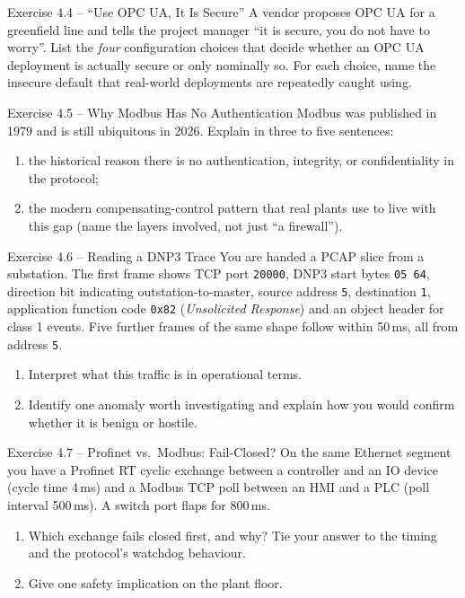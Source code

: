 \documentclass[11pt,a4paper]{article}
\begin{document}
\begin{taskbox}{Exercise 4.4 -- ``Use OPC UA, It Is Secure''}
A vendor proposes OPC UA for a greenfield line and tells the project manager
``it is secure, you do not have to worry''. List the \emph{four}
configuration choices that decide whether an OPC UA deployment is actually
secure or only nominally so. For each choice, name the insecure default that
real-world deployments are repeatedly caught using.
\end{taskbox}

\begin{taskbox}{Exercise 4.5 -- Why Modbus Has No Authentication}
Modbus was published in 1979 and is still ubiquitous in 2026. Explain in
three to five sentences:
\begin{enumerate}
  \item the historical reason there is no authentication, integrity, or
        confidentiality in the protocol;
  \item the modern compensating-control pattern that real plants use to live
        with this gap (name the layers involved, not just ``a firewall'').
\end{enumerate}
\end{taskbox}

\begin{taskbox}{Exercise 4.6 -- Reading a DNP3 Trace}
You are handed a PCAP slice from a substation. The first frame shows TCP
port \texttt{20000}, DNP3 start bytes \texttt{05 64}, direction bit
indicating outstation-to-master, source address \texttt{5}, destination
\texttt{1}, application function code \texttt{0x82} (\emph{Unsolicited
Response}) and an object header for class 1 events. Five further frames of
the same shape follow within 50\,ms, all from address \texttt{5}.
\begin{enumerate}
  \item Interpret what this traffic is in operational terms.
  \item Identify one anomaly worth investigating and explain how you would
        confirm whether it is benign or hostile.
\end{enumerate}
\end{taskbox}

\begin{taskbox}{Exercise 4.7 -- Profinet vs.\ Modbus: Fail-Closed?}
On the same Ethernet segment you have a Profinet RT cyclic exchange between
a controller and an IO device (cycle time 4\,ms) and a Modbus TCP poll
between an HMI and a PLC (poll interval 500\,ms). A switch port flaps for
800\,ms.
\begin{enumerate}
  \item Which exchange fails closed first, and why? Tie your answer to
        the timing and the protocol's watchdog behaviour.
  \item Give one safety implication on the plant floor.
\end{enumerate}
\end{taskbox}
\end{document}
